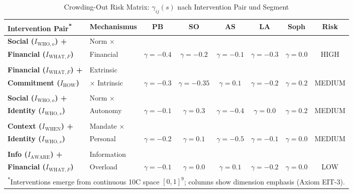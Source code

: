 \begin{table}[htbp]
\centering
\caption{Crowding-Out Risk Matrix: $\gamma_{ij}(s)$ nach Intervention Pair und Segment}
\label{tab:19-crowding-out-matrix}
\renewcommand{\arraystretch}{1.4}
\footnotesize
\begin{tabular}{@{}llcccccc@{}}
\toprule
\textbf{Intervention Pair}\textsuperscript{*} & \textbf{Mechanismus} & \textbf{PB} & \textbf{SO} & \textbf{AS} & \textbf{LA} & \textbf{Soph} & \textbf{Risk} \\
\midrule
\textbf{Social ($I_{\text{WHO},o}$) +} & Norm $\times$ & & & & & & \\
\textbf{Financial ($I_{\text{WHAT},F}$)} & Financial & $\gamma = -0.4$ & $\gamma = -0.2$ & $\gamma = -0.1$ & $\gamma = -0.3$ & $\gamma = 0.0$ & \cellcolor{red!25}HIGH \\
& & & & & & & \\
\textbf{Financial ($I_{\text{WHAT},F}$) +} & Extrinsic & & & & & & \\
\textbf{Commitment ($I_{\text{HOW}}$)} & $\times$ Intrinsic & $\gamma = -0.3$ & $\gamma = -0.35$ & $\gamma = 0.1$ & $\gamma = -0.2$ & $\gamma = 0.2$ & \cellcolor{orange!25}MEDIUM \\
& & & & & & & \\
\textbf{Social ($I_{\text{WHO},o}$) +} & Norm $\times$ & & & & & & \\
\textbf{Identity ($I_{\text{WHO},s}$)} & Autonomy & $\gamma = -0.1$ & $\gamma = 0.3$ & $\gamma = -0.4$ & $\gamma = 0.0$ & $\gamma = 0.2$ & \cellcolor{orange!25}MEDIUM \\
& & & & & & & \\
\textbf{Context ($I_{\text{WHEN}}$) +} & Mandate $\times$ & & & & & & \\
\textbf{Identity ($I_{\text{WHO},s}$)} & Personal & $\gamma = -0.2$ & $\gamma = 0.1$ & $\gamma = -0.5$ & $\gamma = -0.1$ & $\gamma = 0.0$ & \cellcolor{orange!25}MEDIUM \\
& & & & & & & \\
\textbf{Info ($I_{\text{AWARE}}$) +} & Information & & & & & & \\
\textbf{Financial ($I_{\text{WHAT},F}$)} & Overload & $\gamma = -0.1$ & $\gamma = 0.0$ & $\gamma = 0.1$ & $\gamma = -0.2$ & $\gamma = 0.0$ & \cellcolor{green!25}LOW \\
\bottomrule
\multicolumn{8}{l}{\textsuperscript{*}\footnotesize Interventions emerge from continuous 10C space $[0,1]^9$; columns show dimension emphasis (Axiom EIT-3).}
\end{tabular}
\end{table}

